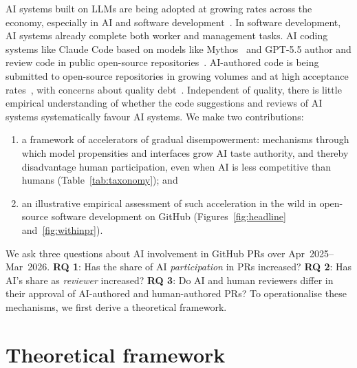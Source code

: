 \documentclass{article}
\begin{document}
AI systems built on LLMs are being adopted at growing rates across the economy, especially in AI and software development~\citep{appel2025economic,stein2026mcp}. In software development, AI systems already complete both worker and management tasks. AI coding systems like Claude Code based on models like Mythos~\citep{glasswing2026} and GPT-5.5 author and review code in public open-source repositories~\citep{ghaleb2026fingerprinting}. AI-authored code is being submitted to open-source repositories in growing volumes and at high acceptance rates~\citep{watanabe2025agentic,li2026aidev,ghaleb2026fingerprinting}, with concerns about quality debt~\citep{agarwal2026ides,ehsani2026fail,huang2026morecode}. Independent of quality, there is little empirical understanding of whether the code suggestions and reviews of AI systems systematically favour AI systems. We make two contributions:
\begin{enumerate}
\setlength{\itemsep}{0pt}\setlength{\parsep}{0pt}\setlength{\parskip}{0pt}\setlength{\topsep}{1pt}
    \item a framework of accelerators of gradual disempowerment: mechanisms through which model propensities and interfaces grow AI taste authority, and thereby disadvantage human participation, even when AI is less competitive than humans (Table~\ref{tab:taxonomy}); and
    \item an illustrative empirical assessment of such acceleration in the wild in open-source software development on GitHub (Figures~\ref{fig:headline} and~\ref{fig:withinpr}).
\end{enumerate}
We ask three questions about AI involvement in GitHub PRs over Apr~2025--Mar~2026. \textbf{RQ 1}: Has the share of AI \emph{participation} in PRs increased? \textbf{RQ 2}: Has AI's share as \emph{reviewer} increased? \textbf{RQ 3}: Do AI and human reviewers differ in their approval of AI-authored and human-authored PRs? To operationalise these mechanisms, we first derive a theoretical framework.

\section{Theoretical framework}
\label{sec:taxonomy}
\end{document}
